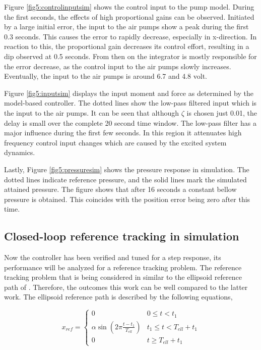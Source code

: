 Figure \ref{fig5:controlinputsim} shows the control input to the pump model. During the first seconds, the effects of high proportional gains can be observed. Initiated by a large initial error, the input to the air pumps show a peak during the first 0.3 seconds. This causes the error to rapidly decrease, especially in x-direction. In reaction to this, the proportional gain decreases its control effort, resulting in a dip observed at 0.5 seconds. From then on the integrator is mostly responsible for the error decrease, as the control input to the air pumps slowly increases. Eventually, the input to the air pumps is around 6.7 and 4.8 volt. 

Figure \ref{fig5:inputsim} displays the input moment and force as determined by the model-based controller. The dotted lines show the low-pass filtered input which is the input to the air pumps. It can be seen that although $\zeta$ is chosen just 0.01, the delay is small over the complete 20 second time window. The low-pass filter has a major influence during the first few seconds. In this region it attenuates high frequency control input changes which are caused by the excited system dynamics. 


Lastly, Figure \ref{fig5:pressuresim} shows the pressure response in simulation. The dotted lines indicate reference pressure, and the solid lines mark the simulated attained pressure. The figure shows that after 16 seconds a constant bellow pressure is obtained. This coincides with the position error being zero after this time.



\subsection*{Closed-loop reference tracking in simulation}

Now the controller has been verified and tuned for a step response, its performance will be analyzed for a reference tracking problem. The reference tracking problem that is being considered in similar to the ellipsoid reference path of \cite{berkers}. Therefore, the outcomes this work can be well compared to the latter work. The ellipsoid reference path is described by the following equations,

\begin{equation}
    x_{ref} = \begin{cases} 
      0 &  0 \leq t < t_1 \\
     \alpha \sin(2\pi \frac{t - t_1}{T_{ell}}) &t_1 \leq t  < T_{ell} + t_1 \\
     0 & t \geq T_{ell} + t_1
   \end{cases} 
\end{equation}


